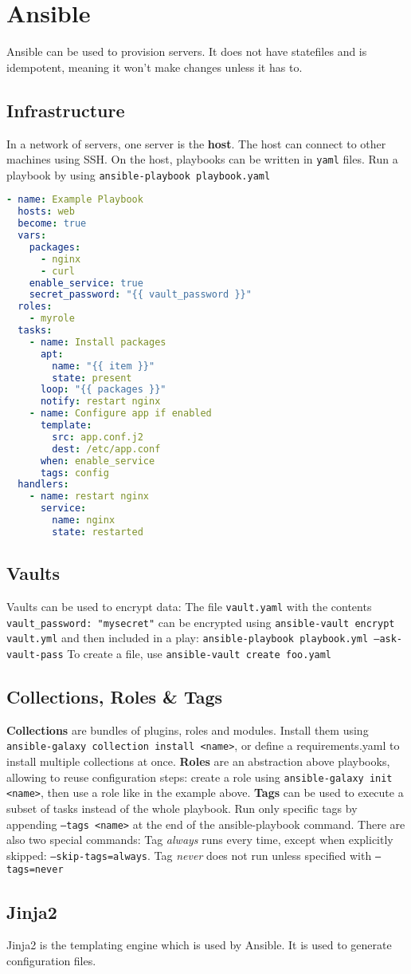 \section{Ansible}
Ansible can be used to provision servers. It does not have statefiles and is idempotent, meaning it won't make changes unless it has to.
\subsection{Infrastructure}
In a network of servers, one server is the \textbf{host}. The host can connect to other machines using SSH. On the host, playbooks can be written in \texttt{yaml} files. Run a playbook by using \texttt{ansible-playbook playbook.yaml}

\begin{lstlisting}[language=yaml]
- name: Example Playbook
  hosts: web
  become: true
  vars:
    packages:
      - nginx
      - curl
    enable_service: true
    secret_password: "{{ vault_password }}"
  roles:
    - myrole
  tasks:
    - name: Install packages
      apt:
        name: "{{ item }}"
        state: present
      loop: "{{ packages }}"
      notify: restart nginx
    - name: Configure app if enabled
      template:
        src: app.conf.j2
        dest: /etc/app.conf
      when: enable_service
      tags: config
  handlers:
    - name: restart nginx
      service:
        name: nginx
        state: restarted
\end{lstlisting}
\subsection{Vaults}
Vaults can be used to encrypt data: The file \texttt{vault.yaml} with the contents \texttt{vault\string_password: "mysecret"} can be encrypted using \texttt{ansible-vault encrypt vault.yml} and then included in a play: \texttt{ansible-playbook playbook.yml --ask-vault-pass}
To create a file, use \texttt{ansible-vault create foo.yaml}
\subsection{Collections, Roles \& Tags}

\textbf{Collections} are bundles of plugins, roles and modules. Install them using \texttt{ansible-galaxy collection install <name>}, or define a requirements.yaml to install multiple collections at once.
\textbf{Roles} are an abstraction above playbooks, allowing to reuse configuration steps: create a role using \texttt{ansible-galaxy init <name>}, then use a role like in the example above.
\textbf{Tags} can be used to execute a subset of tasks instead of the whole playbook. Run only specific tags by appending \texttt{--tags <name>} at the end of the ansible-playbook command. There are also two special commands: Tag \textit{always} runs every time, except when explicitly skipped: \texttt{--skip-tags=always}. Tag \textit{never} does not run unless specified with \texttt{--tags=never}
\subsection{Jinja2}
Jinja2 is the templating engine which is used by Ansible. It is used to generate configuration files.
